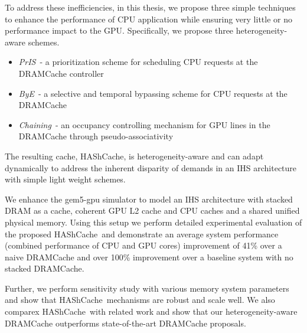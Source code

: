 \documentclass[12pt,a4paper]{report}
\newcommand{\cachename}{HAShCache}
\newcommand{\bypassname}{\textit{ByE}}
\newcommand{\prioname}{\textit{PrIS}}
\newcommand{\chaining}{\textit{Chaining}}
\begin{document}
\par To address these inefficiencies, in this thesis, we propose three simple techniques to enhance the performance of CPU application while ensuring very little or no performance impact to the GPU. Specifically, we propose three heterogeneity-aware schemes.
\begin{itemize}
	\item \prioname\ - a prioritization scheme for scheduling CPU requests at the DRAMCache controller
	\item \bypassname\ - a selective and temporal bypassing scheme for CPU requests at the DRAMCache
	\item \chaining\ - an occupancy controlling mechanism for GPU lines in the DRAMCache through pseudo-associativity
\end{itemize}
The resulting cache, \cachename, is heterogeneity-aware and can adapt dynamically to address the inherent disparity of demands in an IHS architecture with simple light weight schemes. 

\par We enhance the gem5-gpu simulator to model an IHS architecture with stacked DRAM as a cache, coherent GPU L2 cache and CPU caches and a shared unified physical memory. Using this setup we perform detailed experimental evaluation of the proposed \cachename\ and demonstrate an average system performance (combined performance of CPU  and GPU cores) improvement of 41\% over a naive DRAMCache and over 100\% improvement over a baseline system with no stacked DRAMCache.
\par Further, we perform sensitivity study with various memory system parameters and show that \cachename\ mechanisms are robust and scale well. We also comparex \cachename\ with related work and show that our heterogeneity-aware DRAMCache outperforms state-of-the-art DRAMCache proposals.
\end{document}
